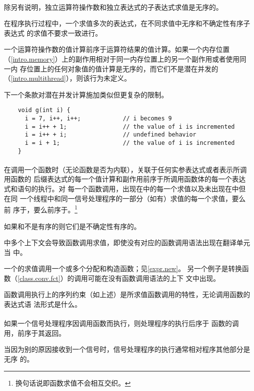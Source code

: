 \paragraph{} %
除另有说明，独立运算符操作数和独立表达式的子表达式求值是无序的。

\begin{note}
  在程序执行过程中，一个求值多次的表达式，在不同求值中无序和不确定性有序子表达式
  的求值不要求一致进行。
\end{note}

一个运算符操作数的值计算前序于运算符结果的值计算。如果一个内存位置
（\ref{intro.memory}）上的副作用相对于同一内存位置上的另一个副作用或者使用同一内
存位置上的任何对象值的值计算是无序的，而它们不是潜在并发的
（\ref{intro.multithread}），则该行为未定义。

\begin{note}
  下一个条款对潜在并发计算施加类似但更复杂的限制。
\end{note}

\begin{example}
  \begin{lstlisting}
    void g(int i) {
      i = 7, i++, i++;            // i becomes 9
      i = i++ + 1;                // the value of i is incremented
      i = i++ + i;                // undefined behavior
      i = i + 1;                  // the value of i is incremented
    }
  \end{lstlisting}
\end{example}

\paragraph{} %
在调用一个函数时（无论函数是否为内联），关联于任何实参表达式或者表示所调用函数的
后缀表达式的每一个值计算和副作用前序于所调用函数体的每一个表达式和语句的执行。对
每一个函数调用，出现在中的每一个求值以及未出现在中但在同
一个线程中和同一信号处理程序的一部分（如有）求值的每一个求值，要么前
序于，要么前序于。\footnote{换句话说即函数求值不会相互交织。}

\begin{note}
  如果和不是有序的则它们是不确定性有序的。
\end{note}

\cpp{}中多个上下文会导致函数调用求值，即使没有对应的函数调用语法出现在翻译单元当
中。

\begin{example}
  一个的求值调用一个或多个分配和构造函数；见\ref{expr.new}。
  另一个例子是转换函数（\ref{class.conv.fct}）的调用可能在没有函数调用语法的上下
  文中出现。
\end{example}

函数调用执行上的序列约束（如上述）是所求值函数调用的特性，无论调用函数的表达式语
法形式是什么。

\paragraph{} %
如果一个信号处理程序因调用函数而执行，则处理程序的执行后序于
函数的调用，前序于其返回。

\begin{note}
  当因为别的原因接收到一个信号时，信号处理程序的执行通常相对程序其他部分是无序
  的。
\end{note}
